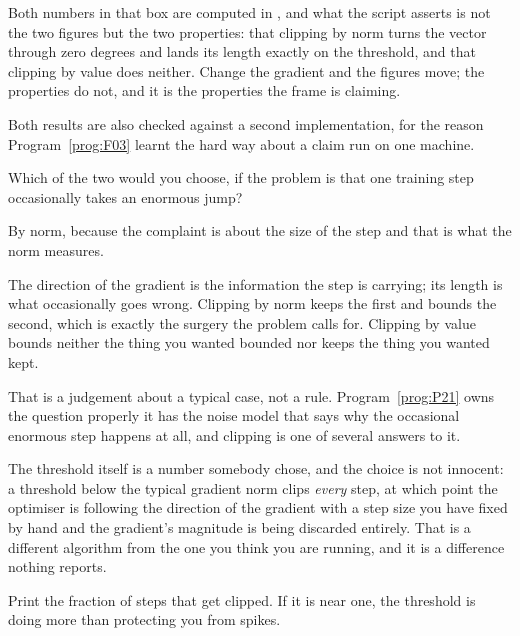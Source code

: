 \begin{fr}
Both numbers in that box are computed in , and
what the script asserts is not the two figures but the two properties: that
clipping by norm turns the vector through zero degrees and lands its length
exactly on the threshold, and that clipping by value does neither. Change the
gradient and the figures move; the properties do not, and it is the properties
the frame is claiming.

Both results are also checked against a second implementation, for the reason
Program~\ref{prog:F03} learnt the hard way about a claim run on one machine.

Which of the two would you choose, if the problem is that one training step
occasionally takes an enormous jump?
\nextframe
\end{fr}

\begin{fr}
\begin{ansblock}
By norm, because the complaint is about the size of the step and that is what
the norm measures.
\end{ansblock}

The direction of the gradient is the information the step is carrying;
its length is what occasionally goes wrong. Clipping by norm keeps the first
and bounds the second, which is exactly the surgery the problem calls for.
Clipping by value bounds neither the thing you wanted bounded nor keeps the
thing you wanted kept.

That is a judgement about a typical case, not a rule. Program~\ref{prog:P21}
owns the question properly \dash{} it has the noise model that says why the
occasional enormous step happens at all, and clipping is one of several
answers to it.

\begin{aibox}
The threshold itself is a number somebody chose, and the choice is not
innocent: a threshold below the typical gradient norm clips \emph{every} step,
at which point the optimiser is following the direction of the gradient with a
step size you have fixed by hand and the gradient's magnitude is being
discarded entirely. That is a different algorithm from the one you think you
are running, and it is a difference nothing reports.

Print the fraction of steps that get clipped. If it is near one, the threshold
is doing more than protecting you from spikes.
\end{aibox}
\end{fr}

